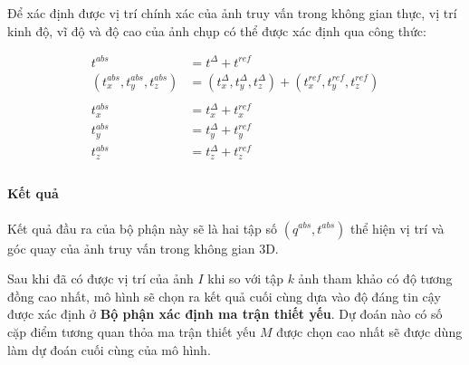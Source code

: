 Để xác định được vị trí chính xác của ảnh truy vấn trong không gian thực, vị trí kinh độ, vĩ độ và độ cao của ảnh chụp có thể được xác định qua công thức:

$$
\begin{aligned}
    t^{abs} &= t^{\Delta} + t^{ref} \\
    (t^{abs}_x,t^{abs}_y,t^{abs}_z) &= (t^{\Delta}_x,t^{\Delta}_y,t^{\Delta}_z) + (t^{ref}_x,t^{ref}_y,t^{ref}_z) \\ \\
    t^{abs}_x &= t^{\Delta}_x + t^{ref}_x \\
    t^{abs}_y &= t^{\Delta}_y + t^{ref}_y \\
    t^{abs}_z &= t^{\Delta}_z + t^{ref}_z \\
\end{aligned}
$$

\paragraph*{Kết quả}

Kết quả đầu ra của bộ phận này sẽ là hai tập số $(q^{abs},t^{abs})$ thể hiện vị trí và góc quay của ảnh truy vấn trong không gian 3D.

Sau khi đã có được vị trí của ảnh $I$ khi so với tập $k$ ảnh tham khảo có độ tương đồng cao nhất, mô hình sẽ chọn ra kết quả cuối cùng dựa vào độ đáng tin cậy được xác định ở \textbf{Bộ phận xác định ma trận thiết yếu}. Dự đoán nào có số cặp điểm tương quan thỏa ma trận thiết yếu $M$ được chọn cao nhất sẽ được dùng làm dự đoán cuối cùng của mô hình.